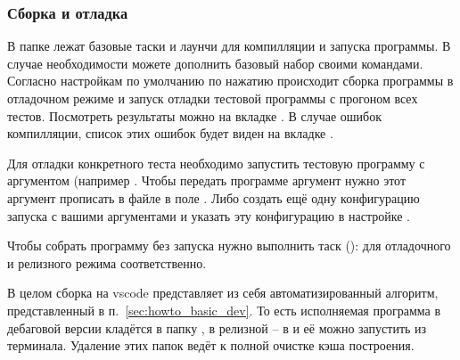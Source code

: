 \subsubsection{Сборка и отладка}
В папке  лежат базовые таски и лаунчи для компилляции и запуска программы.
В случае необходимости можете дополнить базовый набор своими командами.
Согласно настройкам по умолчанию
по нажатию  происходит сборка программы в отладочном режиме и запуск отладки
тестовой программы с прогоном всех тестов.
Посмотреть результаты можно на вкладке .
В случае ошибок компилляции, список этих ошибок будет виден на вкладке .

Для отладки конкретного теста необходимо запустить тестовую программу с аргументом (например .
Чтобы передать программе аргумент нужно этот аргумент прописать в файле 
в поле . Либо создать ещё одну конфигурацию запуска с вашими аргументами и указать эту конфигурацию в настройке .

Чтобы собрать программу без запуска нужно выполнить таск (): 
для отладочного и релизного режима соответственно. 

В целом сборка на vscode представляет из себя автоматизированный алгоритм, представленный в п.~\ref{sec:howto_basic_dev}.
То есть исполняемая программа в дебаговой версии кладётся в папку , в релизной -- в  и её можно запустить из терминала.
Удаление этих папок ведёт к полной очистке кэша построения.

